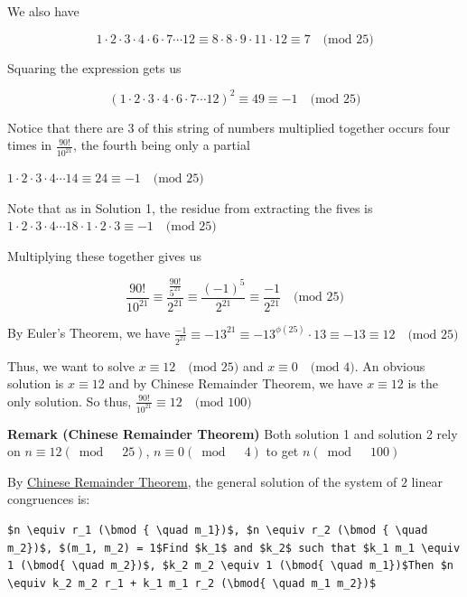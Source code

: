 \begin{enumerate}
 We also have 

 
 \[1\cdot 2\cdot 3\cdot 4\cdot 6\cdot 7\cdots 12 \equiv 8\cdot 8\cdot 9\cdot 11\cdot 12 \equiv 7 \text{ } \text{ (mod } 25 \text{)}\]

 Squaring the expression gets us

 
 \[(1\cdot 2\cdot 3\cdot 4\cdot 6\cdot 7\cdots 12)^2 \equiv 49 \equiv -1 \text{ } \text{ (mod } 25 \text{)}\]

 Notice that there are $3$ of this string of numbers multiplied together occurs four times in $\frac{90!}{10^{21}}$, the fourth being only a partial

 $1\cdot 2\cdot 3\cdot 4\cdots 14 \equiv 24 \equiv -1 \text{ } \text{ (mod } 25 \text{)}$

 Note that as in Solution 1, the residue from extracting the fives is$1\cdot 2\cdot 3\cdot 4\cdots 18 \cdot 1 \cdot 2 \cdot 3 \equiv -1 \text{ } \text{ (mod } 25 \text{)}$

 Multiplying these together gives us

 
 \[\frac{90!}{10^{21}} \equiv \frac{\frac{90!}{5^{21}}}{2^{21}} \equiv \frac{(-1)^5}{2^{21}} \equiv \frac{-1}{2^{21}} \text{ } \text{ (mod } 25 \text{)}\]

 By Euler's Theorem, we have $\frac{-1}{2^{21}} \equiv -13^{21} \equiv -13^{\phi{(25)}}\cdot 13 \equiv -13 \equiv 12 \text{ } \text{ (mod } 25 \text{)}$

 Thus, we want to solve $x \equiv 12 \text{ } \text{ (mod } 25 \text{)}$ and $x \equiv 0 \text{ } \text{ (mod } 4 \text{)}$. An obvious solution is $x\equiv 12$ and by Chinese Remainder Theorem, we have $x\equiv 12$ is the only solution. So thus, $\frac{90!}{10^{21}} \equiv \boxed{12} \text{ } \text{ (mod } 100 \text{)}$

 \textbf{Remark (Chinese Remainder Theorem)} Both solution 1 and solution 2 rely on $n \equiv 12 (\bmod { \quad 25})$, $n \equiv 0 (\bmod { \quad 4})$ to get $n (\bmod { \quad 100})$

 By \href{https://artofproblemsolving.com/wiki/index.php/Chinese\_Remainder\_Theorem}{Chinese Remainder Theorem}, the general solution of the system of $2$ linear congruences is:

 \begin{verbatim}
$n \equiv r_1 (\bmod { \quad m_1})$, $n \equiv r_2 (\bmod { \quad m_2})$, $(m_1, m_2) = 1$Find $k_1$ and $k_2$ such that $k_1 m_1 \equiv 1 (\bmod{ \quad m_2})$, $k_2 m_2 \equiv 1 (\bmod{ \quad m_1})$Then $n \equiv k_2 m_2 r_1 + k_1 m_1 r_2 (\bmod{ \quad m_1 m_2})$
\end{verbatim}


\end{enumerate}
